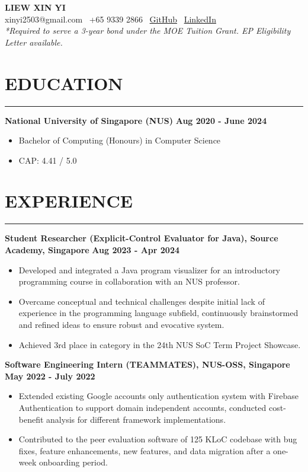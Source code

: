\documentclass{article}
\begin{document}
\begin{center}
    \textbf{\huge LIEW XIN YI} \\

    xinyi2503@gmail.com \textbar\
    +65 9339 2866 \textbar\
    \href{https://github.com/xyliew25}{GitHub} \textbar\
    \href{https://linkedin.com/in/xyliew}{LinkedIn} \\

    \emph{*Required to serve a 3-year bond under the MOE Tuition Grant.
    EP Eligibility Letter available.}
\end{center}

\section*{EDUCATION}
\vspace{-12pt}
\rule{\textwidth}{3pt}
\textbf{National University of Singapore (NUS)} \hfill \textbf{Aug 2020 - June 2024}
\begin{itemize}
    \item Bachelor of Computing (Honours) in Computer Science
    \item CAP: 4.41 / 5.0
\end{itemize}

\section*{EXPERIENCE}
\vspace{-12pt}
\rule{\textwidth}{3pt}
\textbf{Student Researcher (Explicit-Control Evaluator for Java), Source Academy, Singapore}
\hfill \textbf{Aug 2023 - Apr 2024}
\begin{itemize}
    \item Developed and integrated a Java program visualizer for
    an introductory programming course in collaboration with an NUS professor.
    \item Overcame conceptual and technical challenges despite initial lack of experience
    in the programming language subfield, continuously brainstormed and refined ideas
    to ensure robust and evocative system.
    \item Achieved 3rd place in category in the 24th NUS SoC Term Project Showcase.
\end{itemize}

\noindent \textbf{Software Engineering Intern (TEAMMATES), NUS-OSS, Singapore}
\hfill \textbf{May 2022 - July 2022}
\begin{itemize}
    \item Extended existing Google accounts only authentication system with
    Firebase Authentication to support domain independent accounts,
    conducted cost-benefit analysis for different framework implementations.
    \item Contributed to the peer evaluation software of 125 KLoC codebase with bug fixes,
    feature enhancements, new features, and data migration after a one-week onboarding period.
\end{itemize}
\end{document}
